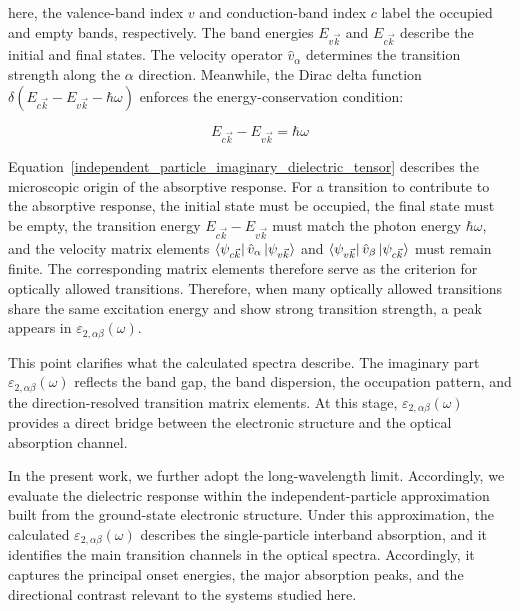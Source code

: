 here, the valence-band index $v$ and conduction-band index $c$ label the occupied and empty bands, respectively.
The band energies $E_{v\vec{k}}$ and $E_{c\vec{k}}$ describe the initial and final states.
The velocity operator $\hat{v}_{\alpha}$ determines the transition strength along the $\alpha$ direction.
Meanwhile, the Dirac delta function $\delta\left(E_{c\vec{k}}-E_{v\vec{k}}-\hbar\omega\right)$ enforces the energy-conservation condition:

\begin{equation}
    E_{c\vec{k}}-E_{v\vec{k}}=\hbar\omega
\label{dirac_energy_conservation_condition}
\end{equation}

Equation~\eqref{independent_particle_imaginary_dielectric_tensor} describes the microscopic origin of the absorptive response.
For a transition to contribute to the absorptive response,
the initial state must be occupied,
the final state must be empty, the transition energy
$E_{c\vec{k}}-E_{v\vec{k}}$ must match the photon energy $\hbar\omega$,
and the velocity matrix elements
$\bra{\psi_{c\vec{k}}}\hat{v}_{\alpha}\ket{\psi_{v\vec{k}}}$
and $\bra{\psi_{v\vec{k}}}\hat{v}_{\beta}\ket{\psi_{c\vec{k}}}$
must remain finite.
The corresponding matrix elements therefore serve as the criterion for optically allowed transitions.
Therefore, when many optically allowed transitions share the same excitation energy and show strong transition strength,
a peak appears in $\varepsilon_{2,\alpha\beta}(\omega)$.

This point clarifies what the calculated spectra describe.
The imaginary part $\varepsilon_{2,\alpha\beta}(\omega)$ reflects the band gap,
the band dispersion, the occupation pattern,
and the direction-resolved transition matrix elements.
At this stage, $\varepsilon_{2,\alpha\beta}(\omega)$ provides a direct bridge between the electronic structure and the optical absorption channel.

In the present work, we further adopt the long-wavelength limit.
Accordingly, we evaluate the dielectric response within the independent-particle approximation built from the ground-state electronic structure.
Under this approximation, the calculated $\varepsilon_{2,\alpha\beta}(\omega)$ describes the single-particle interband absorption,
and it identifies the main transition channels in the optical spectra.
Accordingly, it captures the principal onset energies, the major absorption peaks,
and the directional contrast relevant to the systems studied here.


